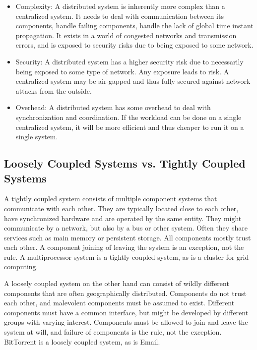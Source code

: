 \documentclass[a4paper]{article}
\begin{document}
\begin{itemize}

    \item Complexity: A distributed system is inherently more complex than a centralized system. It needs to deal with communication between its components, handle failing components, handle the lack of global time instant propagation. It exists in a world of congested networks and transmission errors, and is exposed to security risks due to being exposed to some network.

    \item Security: A distributed system has a higher security risk due to necessarily being exposed to some type of network. Any exposure leads to risk. A centralized system may be air-gapped and thus fully secured against network attacks from the outside.

    \item Overhead: A distributed system has some overhead to deal with synchronization and coordination. If the workload can be done on a single centralized system, it will be more efficient and thus cheaper to run it on a single system.

\end{itemize}

\subsection{Loosely Coupled Systems vs. Tightly Coupled Systems}

A tightly coupled system consists of multiple component systems that communicate with each other. They are typically located close to each other, have synchronized hardware and are operated by the same entity. They might communicate by a network, but also by a bus or other system. Often they share services such as main memory or persistent storage. All components mostly trust each other. A component joining of leaving the system is an exception, not the rule. A multiprocessor system is a tightly coupled system, as is a cluster for grid computing.

A loosely coupled system on the other hand can consist of wildly different components that are often geographically distributed. Components do not trust each other, and malevolent components must be assumed to exist. Different components must have a common interface, but might be developed by different groups with varying interest. Components must be allowed to join and leave the system at will, and failure of components is the rule, not the exception. BitTorrent is a loosely coupled system, as is Email.
\end{document}
